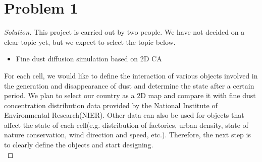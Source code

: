\section*{Problem 1}
	\begin{proof} [Solution]
		This project is carried out by two people. We have not decided on a clear topic yet, but we expect to select the topic below.
		\begin{itemize}
			\item Fine dust diffusion simulation based on 2D CA
		\end{itemize}
		For each cell, we would like to define the interaction of various objects involved in the generation and disappearance of dust and determine the state after a certain period. We plan to select our country as a 2D map and compare it with fine dust concentration distribution data provided by the National Institute of Environmental Research(NIER). Other data can also be used for objects that affect the state of each cell(e.g. distribution of factories, urban density, state of nature conservation, wind direction and speed, etc.). Therefore, the next step is to clearly define the objects and start designing.\\
	\end{proof}